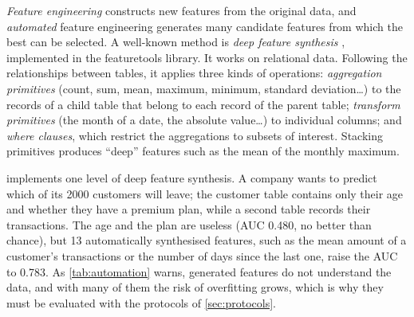 \emph{Feature engineering} constructs new features from the original data, and \emph{automated} feature
engineering generates many candidate features from which the best can be selected. A well-known
method is \emph{deep feature synthesis} \citep{kanter2015deep}, implemented in the featuretools library.
It works on relational data. Following the relationships between tables, it applies
three kinds of operations: \emph{aggregation primitives} (count, sum, mean, maximum, minimum, standard deviation\dots) to the
records of a child table that belong to each record of the parent table; \emph{transform primitives}
(the month of a date, the absolute value\dots) to individual columns; and \emph{where clauses}, which
restrict the aggregations to subsets of interest. Stacking primitives produces ``deep'' features such
as the mean of the monthly maximum.

 implements one level of deep feature synthesis. A company wants to predict which of its
2000 customers will leave; the customer table contains only their age and whether they have a premium
plan, while a second table records their transactions. The age and the plan are useless (AUC 0.480,
no better than chance), but 13 automatically synthesised features, such as the mean amount of a
customer's transactions or the number of days since the last one, raise the AUC to 0.783. As
\cref{tab:automation} warns, generated features do not understand the data, and with many of them
the risk of overfitting grows, which is why they must be evaluated with the protocols of
\cref{sec:protocols}.

